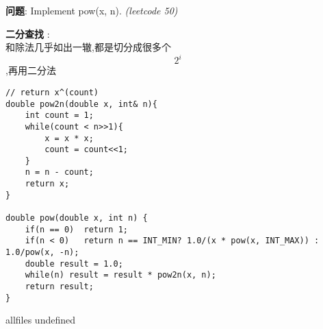 \documentclass{article}
\begin{document}
\begin{CJK}{UTF8}{gbsn}     %

\else
    
\begin{description}
    \item{\textbf{问题}}: Implement pow(x, n). \textit{(leetcode 50)}
    \item{\textbf{二分查找}} : 
    \\和除法几乎如出一辙,都是切分成很多个$$2^i$$,再用二分法
    \begin{lstlisting}
// return x^(count)
double pow2n(double x, int& n){
	int count = 1;
	while(count < n>>1){
		x = x * x;
		count = count<<1;
	}
	n = n - count;
	return x;
}

double pow(double x, int n) {
	if(n == 0)	return 1;
	if(n < 0)	return n == INT_MIN? 1.0/(x * pow(x, INT_MAX)) : 1.0/pow(x, -n);
	double result = 1.0;
	while(n) result = result * pow2n(x, n);	
	return result;
}
    \end{lstlisting}
\end{description}

\fi

\ifx allfiles undefined
\end{CJK}
\end{document}
